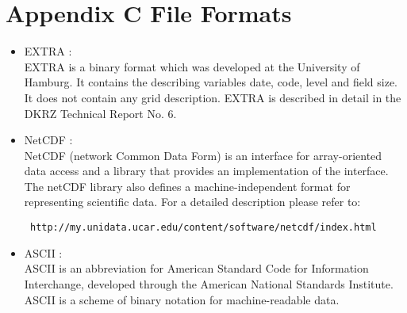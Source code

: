 \section{Appendix C \hspace{0.5cm} File Formats}
\label{ch:appendix:formats}

\begin{itemize}
\item EXTRA :\\
EXTRA is a binary format which was developed at the University of Hamburg. 
It contains the describing variables date, code, level and field size. It does not 
contain any grid description. EXTRA is described in detail in the DKRZ Technical Report No. 6.

\item NetCDF :\\
NetCDF (network Common Data Form) is an interface for array-oriented data access and a 
library that provides an implementation of the interface. 
The netCDF library also defines a machine-independent format for representing scientific data. 
For a detailed description please refer to: 
\begin{verbatim} http://my.unidata.ucar.edu/content/software/netcdf/index.html \end{verbatim} 
\item ASCII :\\
ASCII is an abbreviation for American Standard Code for Information Interchange, 
developed through the American National Standards Institute. 
ASCII is a scheme of binary notation for machine-readable data.
\end{itemize}


